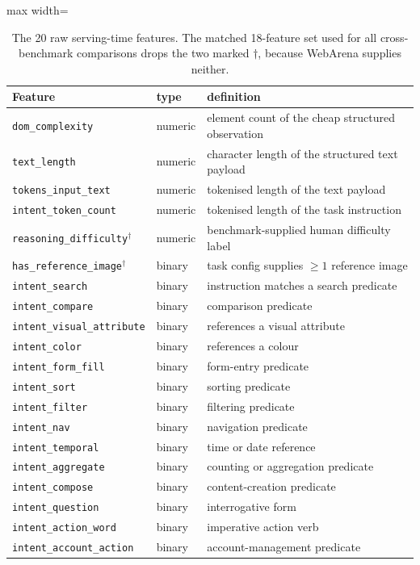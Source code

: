 \begin{table}[H]
\centering\small
\caption{The 20 raw serving-time features. The matched 18-feature set used for
all cross-benchmark comparisons drops the two marked $\dagger$, because
WebArena supplies neither.}
\label{tab:app-features}
\begin{adjustbox}{max width=\textwidth}
\begin{tabular}{@{}llp{7.2cm}@{}}
\toprule
Feature & type & definition \\
\midrule
\texttt{dom\_complexity}    & numeric & element count of the cheap structured observation \\
\texttt{text\_length}       & numeric & character length of the structured text payload \\
\texttt{tokens\_input\_text}& numeric & tokenised length of the text payload \\
\texttt{intent\_token\_count}& numeric & tokenised length of the task instruction \\
\texttt{reasoning\_difficulty}$^\dagger$ & numeric & benchmark-supplied human difficulty label \\
\midrule
\texttt{has\_reference\_image}$^\dagger$ & binary & task config supplies $\geq1$ reference image \\
\texttt{intent\_search}     & binary & instruction matches a search predicate \\
\texttt{intent\_compare}    & binary & comparison predicate \\
\texttt{intent\_visual\_attribute} & binary & references a visual attribute \\
\texttt{intent\_color}      & binary & references a colour \\
\texttt{intent\_form\_fill} & binary & form-entry predicate \\
\texttt{intent\_sort}       & binary & sorting predicate \\
\texttt{intent\_filter}     & binary & filtering predicate \\
\texttt{intent\_nav}        & binary & navigation predicate \\
\texttt{intent\_temporal}   & binary & time or date reference \\
\texttt{intent\_aggregate}  & binary & counting or aggregation predicate \\
\texttt{intent\_compose}    & binary & content-creation predicate \\
\texttt{intent\_question}   & binary & interrogative form \\
\texttt{intent\_action\_word}& binary & imperative action verb \\
\texttt{intent\_account\_action} & binary & account-management predicate \\
\bottomrule
\end{tabular}
\end{adjustbox}
\end{table}

